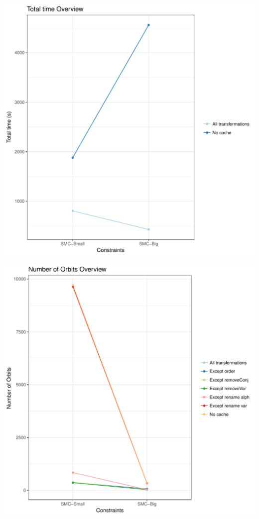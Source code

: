 \documentclass{article}\usepackage[]{graphicx}\usepackage[]{color}
\makeatletter
\def\maxwidth{ %
  \ifdim\Gin@nat@width>\linewidth
    \linewidth
  \else
    \Gin@nat@width
  \fi
}
\newenvironment{knitrout}{}{} %
\makeatother
\begin{document}
\begin{knitrout}
\color{fgcolor}
\includegraphics[width=\maxwidth]{figure/overview_sumTime-1} 

\end{knitrout}
\begin{knitrout}
\color{fgcolor}
\includegraphics[width=\maxwidth]{figure/overview_orbits-1} 

\end{knitrout}
\end{document}

